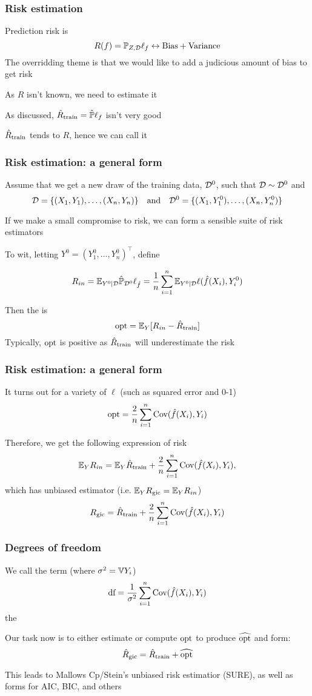 \documentclass{beamer}
\begin{document}
\begin{frame}
\frametitle{Risk estimation}
  Prediction risk is
\[
R(f) = \mathbb{P}_{Z,\mathcal{D}} \ell_f \leftrightarrow \textrm{Bias} + \textrm{Variance}
\]
The overridding theme is that we would like to add a judicious amount of bias to get  risk

\vsp
As $R$ isn't known, we need to estimate it

\vsp
As discussed, $\hat{R}_{\textrm{train}} = \hat{\mathbb{P}}\ell_f$ isn't very good


\vsp
$\hat{R}_{\textrm{train}}$ tends to  $R$, hence we can call it 
\end{frame}

\begin{frame}
\frametitle{Risk estimation: a general form}
Assume that we get a new draw of the training data, $\mathcal{D}^0$, such that $\mathcal{D} \sim \mathcal{D}^0$ and
\[
\mathcal{D} = \{(X_1,Y_1), \ldots, (X_n,Y_n)\} \quad \textrm{and} \quad \mathcal{D}^0 = \{(X_1,Y_1^0), \ldots, (X_n,Y_n^0)\}
\]

\vsp
If we make a small compromise to risk, we can form a sensible suite of risk estimators

\vsp
To wit, letting $Y^0 = (Y_1^0,\ldots,Y_n^0)^{\top}$, define 

\[
R_{in} = \mathbb{E}_{Y^0 | \mathcal{D}}  \hat{\mathbb{P}}_{\mathcal{D}^0}  \ell_{\hat{f}}= \frac{1}{n} \sum_{i=1}^n \mathbb{E}_{Y^0 | \mathcal{D}} \ell(\hat{f}(X_i),Y_i^0)
\]
\vsp

Then the  is
\[
\textrm{opt} = \mathbb{E}_Y [ R_{in} - \hat{R}_{\textrm{train}}]
\]
Typically, $\textrm{opt}$ is positive as $\hat{R}_{\textrm{train}}$ will underestimate the risk
\end{frame}

\begin{frame}
\frametitle{Risk estimation: a general form}
It turns out for a variety of $\ell$ (such as squared error and 0-1)
\[
\textrm{opt} = \frac{2}{n} \sum_{i=1}^n \textrm{Cov}(\hat f(X_i),Y_i)
\]
\vsp

Therefore, we get the following expression of risk
\[
 \mathbb{E}_Y R_{in} = \mathbb{E}_Y \hat{R}_{\textrm{train}} + \frac{2}{n} \sum_{i=1}^n \textrm{Cov}(\hat f(X_i),Y_i),
\]
which has unbiased estimator (i.e. $\mathbb{E}_Y R_{\textrm{gic}} =  \mathbb{E}_Y R_{in}$)
\[
R_{\textrm{gic}} = \hat{R}_{\textrm{train}} + \frac{2}{n} \sum_{i=1}^n \textrm{Cov}(\hat f(X_i),Y_i)
\]
\end{frame}

\begin{frame}
\frametitle{Degrees of freedom}
We call the term (where $\sigma^2 = \mathbb{V} Y_i$)
\[
\textrm{df} = \frac{1}{\sigma^2} \sum_{i=1}^n \textrm{Cov}(\hat f(X_i),Y_i)
\]
the 


\vsp
Our task now is to either estimate or compute $\textrm{opt}$ to produce $\widehat{\textrm{opt}}$ and form:
\[
\hat{R}_{\textrm{gic}} = \hat{R}_{\textrm{train}} + \widehat{\textrm{opt}}
\]

\vsp
This leads to Mallows Cp/Stein's unbiased risk estimatior (SURE), as well
as forms for AIC, BIC, and others

\end{frame}
\end{document}
